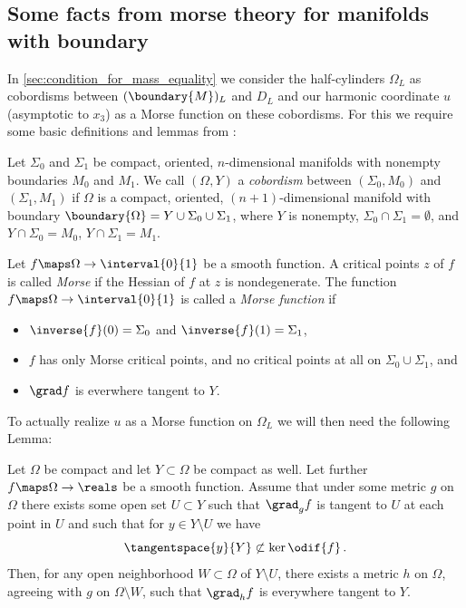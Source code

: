 \documentclass[titlepage,numbers=noenddot,oneside,%
cleardoublepage=empty,paper=a4,fontsize=11pt,%
english,%
]{scrartcl}
\newcommand*{\mathfullstop}{\,.}
\begin{document}
\subsection{Some facts from morse theory for manifolds with boundary}\label{sec:morse_theory}
In \cref{sec:condition_for_mass_equality} we consider the half-cylinders \( \Omega_L \) as cobordisms between \( (\boundary{M})_L \) and \( D_L \) and our harmonic coordinate \( u \) (asymptotic to \( x_3 \)) as a Morse function on these cobordisms. For this we require some basic definitions and lemmas from \cite{borodzikMorseTheoryManifolds2016}:
\begin{definition}\label{def:cobordism}
    Let \( \Sigma_0 \) and \( \Sigma_1 \) be compact, oriented, \( n \)-dimensional manifolds with nonempty boundaries \( M_0 \) and \( M_1 \). We call \( (\Omega,Y) \) a \emph{cobordism} between \( (\Sigma_0,M_0) \) and \( (\Sigma_1,M_1) \) if \( \Omega \) is a compact, oriented, \( (n+1) \)-dimensional manifold with boundary \( \boundary{\Omega}=Y\cup \Sigma_0\cup \Sigma_1 \), where \( Y \) is nonempty, \( \Sigma_0\cap \Sigma_1=\emptyset \), and \( Y\cap \Sigma_0=M_0 \), \( Y\cap \Sigma_1=M_1 \).
\end{definition}
\begin{definition}\label{def:morse_function}
    Let \( f\maps \Omega\to \interval{0}{1}   \) be a smooth function. A critical points \( z \) of \( f \) is called \emph{Morse} if the Hessian of \( f \) at \( z \) is nondegenerate. The function \( f\maps \Omega\to \interval{0}{1} \) is called a \emph{Morse function} if 
    \begin{itemize}
        \item \( \inverse{f}(0)=\Sigma_0 \) and \( \inverse{f}(1)=\Sigma_1 \),
        \item \( f \) has only Morse critical points, and no critical points at all on \( \Sigma_0\cup \Sigma_1 \), and
        \item \( \grad f \) is everwhere tangent to \( Y \).
    \end{itemize}
\end{definition}
To actually realize \( u \) as a Morse function on \( \Omega_L \) we will then need the following Lemma:
\begin{lemma}\label{lem:realize_harmonic_function_as_morse_function}
    Let \( \Omega \) be compact and let \( Y\subset \Omega \) be compact as well. Let further \( f\maps \Omega\to \reals \) be a smooth function. Assume that under some metric \( g \) on \( \Omega \) there exists some open set \( U\subset Y \) such that \( \grad_g f \) is tangent to \( U \) at each point in \( U \) and such that for \( y\in Y\setminus U \) we have 
    \begin{equation*}
        \tangentspace{y}{Y}\not\subset \ker\odif{f}\mathfullstop
    \end{equation*}
    Then, for any open neighborhood \( W\subset \Omega \) of \( Y\setminus U \), there exists a metric \( h \) on \( \Omega \), agreeing with \( g \) on \( \Omega\setminus W \), such that \( \grad_h f \) is everywhere tangent to \( Y \).
\end{lemma}
\end{document}
